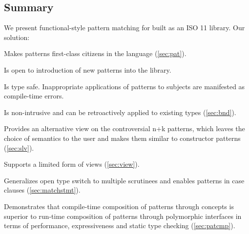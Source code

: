 
\subsection{Summary}

We present functional-style pattern matching for \Cpp{} built as an ISO 
\Cpp{}11 library. Our solution:

\begin{compactitem}
\setlength{\itemsep}{0pt}
\setlength{\parskip}{0pt}
  \item Makes patterns first-class citizens in the language (\textsection\ref{sec:pat}).
  \item Is open to introduction of new patterns into the library.
  \item Is type safe. Inappropriate applications of patterns to subjects are manifested as compile-time errors.  
  \item Is non-intrusive and can be retroactively applied to existing types (\textsection\ref{sec:bnd}).
  \item Provides an alternative view on the controversial n+k patterns, which 
        leaves the choice of semantics to the user and makes them similar to 
        constructor patterns (\textsection\ref{sec:slv}).
  \item Supports a limited form of views (\textsection\ref{sec:view}).
  \item Generalizes open type switch to multiple scrutinees and enables patterns 
        in case clauses (\textsection\ref{sec:matchstmt}).
  \item Demonstrates that compile-time composition of patterns through 
        concepts is superior to run-time composition of patterns through 
        polymorphic interfaces in terms of performance, expressiveness and 
        static type checking (\textsection\ref{sec:patcmp}).
\end{compactitem}


